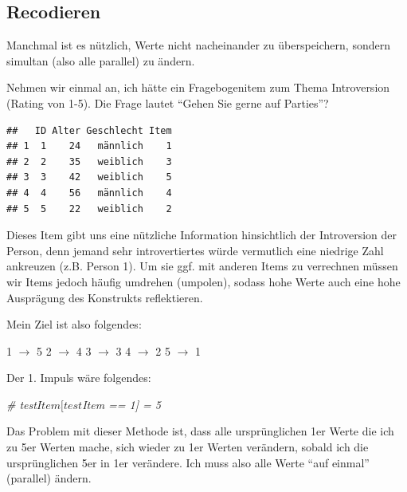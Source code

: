 \documentclass[
]{book}
\newenvironment{Shaded}{\begin{snugshade}}{\end{snugshade}}
\newcommand{\CommentTok}[1]{\textcolor[rgb]{0.56,0.35,0.01}{\textit{#1}}}
\newcommand{\DecValTok}[1]{\textcolor[rgb]{0.00,0.00,0.81}{#1}}
\newcommand{\FunctionTok}[1]{\textcolor[rgb]{0.13,0.29,0.53}{\textbf{#1}}}
\newcommand{\NormalTok}[1]{#1}
\newcommand{\OtherTok}[1]{\textcolor[rgb]{0.56,0.35,0.01}{#1}}
\newcommand{\SpecialCharTok}[1]{\textcolor[rgb]{0.81,0.36,0.00}{\textbf{#1}}}
\begin{document}
\subsection{Recodieren}\label{recodieren}

Manchmal ist es nützlich, Werte nicht nacheinander zu überspeichern, sondern simultan (also alle parallel) zu ändern.

Nehmen wir einmal an, ich hätte ein Fragebogenitem zum Thema Introversion (Rating von 1-5). Die Frage lautet ``Gehen Sie gerne auf Parties''?

\begin{Shaded}
\end{Shaded}

\begin{verbatim}
##   ID Alter Geschlecht Item
## 1  1    24   männlich    1
## 2  2    35   weiblich    3
## 3  3    42   weiblich    5
## 4  4    56   männlich    4
## 5  5    22   weiblich    2
\end{verbatim}

Dieses Item gibt uns eine nützliche Information hinsichtlich der Introversion der Person, denn jemand sehr introvertiertes würde vermutlich eine niedrige Zahl ankreuzen (z.B. Person 1). Um sie ggf. mit anderen Items zu verrechnen müssen wir Items jedoch häufig umdrehen (umpolen), sodass hohe Werte auch eine hohe Ausprägung des Konstrukts reflektieren.

Mein Ziel ist also folgendes:

1 \(\rightarrow\) 5
2 \(\rightarrow\) 4
3 \(\rightarrow\) 3
4 \(\rightarrow\) 2
5 \(\rightarrow\) 1

Der 1. Impuls wäre folgendes:

\begin{Shaded}
\begin{Highlighting}[]
\CommentTok{\# test$Item[test$Item == 1] = 5}
\end{Highlighting}
\end{Shaded}

Das Problem mit dieser Methode ist, dass alle ursprünglichen 1er Werte die ich zu 5er Werten mache, sich wieder zu 1er Werten verändern, sobald ich die ursprünglichen 5er in 1er verändere. Ich muss also alle Werte ``auf einmal'' (parallel) ändern.
\end{document}
